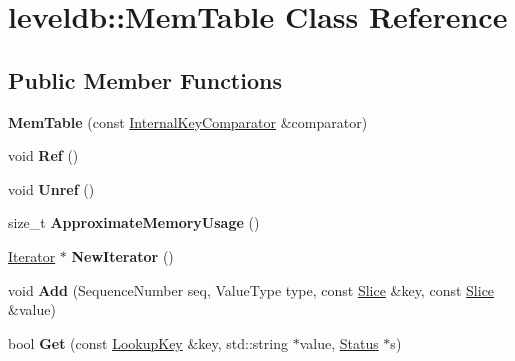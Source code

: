 \hypertarget{classleveldb_1_1_mem_table}{}\section{leveldb\+::Mem\+Table Class Reference}
\label{classleveldb_1_1_mem_table}
\subsection*{Public Member Functions}
\begin{DoxyCompactItemize}
\item 
\mbox{\label{classleveldb_1_1_mem_table_a23add92a4a6e5d1521f3b6695dba5c2d}} 
{\bfseries Mem\+Table} (const \mbox{\hyperlink{classleveldb_1_1_internal_key_comparator}{Internal\+Key\+Comparator}} \&comparator)
\item 
\mbox{\label{classleveldb_1_1_mem_table_a332484cffd2ebc7d6a51f22eeeeeb71b}} 
void {\bfseries Ref} ()
\item 
\mbox{\label{classleveldb_1_1_mem_table_a5dcbf17d1477e6098a30dadd0745cfb2}} 
void {\bfseries Unref} ()
\item 
\mbox{\label{classleveldb_1_1_mem_table_a667a1ada274201f0bdd3615baf1bd882}} 
size\+\_\+t {\bfseries Approximate\+Memory\+Usage} ()
\item 
\mbox{\label{classleveldb_1_1_mem_table_a396b8ba5e2ea0de25b666026f3b9235f}} 
\mbox{\hyperlink{classleveldb_1_1_iterator}{Iterator}} $\ast$ {\bfseries New\+Iterator} ()
\item 
\mbox{\label{classleveldb_1_1_mem_table_a37bec80954badb2354426aa175e9371f}} 
void {\bfseries Add} (Sequence\+Number seq, Value\+Type type, const \mbox{\hyperlink{classleveldb_1_1_slice}{Slice}} \&key, const \mbox{\hyperlink{classleveldb_1_1_slice}{Slice}} \&value)
\item 
\mbox{\label{classleveldb_1_1_mem_table_af94f80a5909a440d0675afa68f8765c5}} 
bool {\bfseries Get} (const \mbox{\hyperlink{classleveldb_1_1_lookup_key}{Lookup\+Key}} \&key, std\+::string $\ast$value, \mbox{\hyperlink{classleveldb_1_1_status}{Status}} $\ast$s)
\end{DoxyCompactItemize}
